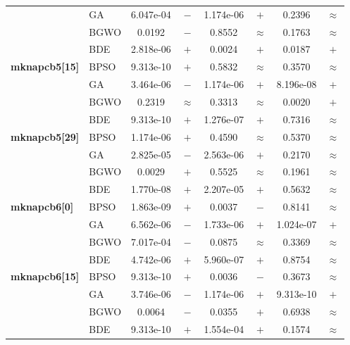 \begin{table}[htbp]
\begin{tabular*}{\textwidth}{@{\extracolsep{\fill}}llcccccc@{}}
                       & GA    & 6.047e-04 & $-$ & 1.174e-06 & $+$ &    0.2396 & $\approx$ \\
                       & BGWO  &    0.0192 & $-$ &    0.8552 & $\approx$ &    0.1763 & $\approx$ \\
                       & BDE   & 2.818e-06 & $+$ &    0.0024 & $+$ &    0.0187 & $+$ \\
    \midrule
    \textbf{mknapcb5[15]} & BPSO  & 9.313e-10 & $+$ &    0.5832 & $\approx$ &    0.3570 & $\approx$ \\
                       & GA    & 3.464e-06 & $-$ & 1.174e-06 & $+$ & 8.196e-08 & $+$ \\
                       & BGWO  &    0.2319 & $\approx$ &    0.3313 & $\approx$ &    0.0020 & $+$ \\
                       & BDE   & 9.313e-10 & $+$ & 1.276e-07 & $+$ &    0.7316 & $\approx$ \\
    \midrule
    \textbf{mknapcb5[29]} & BPSO  & 1.174e-06 & $+$ &    0.4590 & $\approx$ &    0.5370 & $\approx$ \\
                       & GA    & 2.825e-05 & $-$ & 2.563e-06 & $+$ &    0.2170 & $\approx$ \\
                       & BGWO  &    0.0029 & $+$ &    0.5525 & $\approx$ &    0.1961 & $\approx$ \\
                       & BDE   & 1.770e-08 & $+$ & 2.207e-05 & $+$ &    0.5632 & $\approx$ \\
    \midrule
    \textbf{mknapcb6[0]} & BPSO  & 1.863e-09 & $+$ &    0.0037 & $-$ &    0.8141 & $\approx$ \\
                       & GA    & 6.562e-06 & $-$ & 1.733e-06 & $+$ & 1.024e-07 & $+$ \\
                       & BGWO  & 7.017e-04 & $-$ &    0.0875 & $\approx$ &    0.3369 & $\approx$ \\
                       & BDE   & 4.742e-06 & $+$ & 5.960e-07 & $+$ &    0.8754 & $\approx$ \\
    \midrule
    \textbf{mknapcb6[15]} & BPSO  & 9.313e-10 & $+$ &    0.0036 & $-$ &    0.3673 & $\approx$ \\
                       & GA    & 3.746e-06 & $-$ & 1.174e-06 & $+$ & 9.313e-10 & $+$ \\
                       & BGWO  &    0.0064 & $-$ &    0.0355 & $+$ &    0.6938 & $\approx$ \\
                       & BDE   & 9.313e-10 & $+$ & 1.554e-04 & $+$ &    0.1574 & $\approx$ \\

\end{tabular*}
\end{table}
